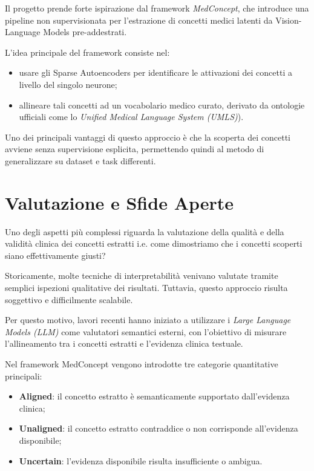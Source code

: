 Il progetto prende forte ispirazione dal framework \textit{MedConcept}, che introduce una pipeline non supervisionata per l'estrazione di concetti medici latenti da Vision-Language Models pre-addestrati.

L'idea principale del framework consiste nel:

\begin{itemize}
    \item usare gli Sparse Autoencoders per identificare le attivazioni dei concetti a livello del singolo neurone;
    
    \item allineare tali concetti ad un vocabolario medico curato, derivato da ontologie ufficiali come lo \textit{Unified Medical Language System (UMLS)}).
\end{itemize}

Uno dei principali vantaggi di questo approccio è che la scoperta dei concetti avviene senza supervisione esplicita, permettendo quindi al metodo di generalizzare su dataset e task differenti.

\section{Valutazione e Sfide Aperte}

Uno degli aspetti più complessi riguarda la valutazione della qualità e della validità clinica dei concetti estratti i.e. come dimostriamo che i concetti scoperti siano effettivamente giusti?

Storicamente, molte tecniche di interpretabilità venivano valutate tramite semplici ispezioni qualitative dei risultati. Tuttavia, questo approccio risulta soggettivo e difficilmente scalabile.

Per questo motivo, lavori recenti hanno iniziato a utilizzare i \textit{Large Language Models (LLM)} come valutatori semantici esterni, con l'obiettivo di misurare l'allineamento tra i concetti estratti e l'evidenza clinica testuale.

Nel framework MedConcept vengono introdotte tre categorie quantitative principali:

\begin{itemize}
    \item \textbf{Aligned}: il concetto estratto è semanticamente supportato dall'evidenza clinica;
    
    \item \textbf{Unaligned}: il concetto estratto contraddice o non corrisponde all'evidenza disponibile;
    
    \item \textbf{Uncertain}: l'evidenza disponibile risulta insufficiente o ambigua.
\end{itemize}

